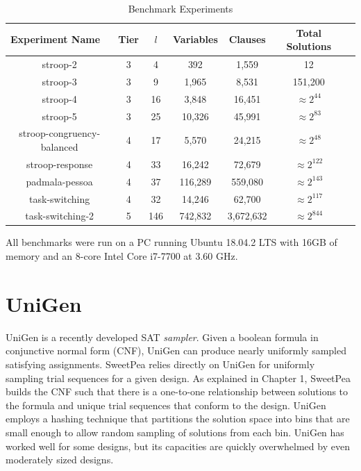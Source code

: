 \begin{table}[htb]
  \centering
  \caption{Benchmark Experiments}
\begin{tabular}{|c|c|c|c|c|c|c|}
\hline
\multicolumn{1}{|l|}{Experiment Name} & Tier            & $l$             & Variables  & Clauses    & Total Solutions    \\ \hline
stroop-2                              & 3               & 4               & 392        & 1,559      & 12                 \\ \hline
stroop-3                              & 3               & 9               & 1,965      & 8,531      & 151,200            \\ \hline
stroop-4                              & 3               & 16              & 3,848      & 16,451     & $\approx 2^{44}$   \\ \hline
stroop-5                              & 3               & 25              & 10,326     & 45,991     & $\approx 2^{83}$   \\ \hline
stroop-congruency-balanced            & 4               & 17              & 5,570      & 24,215     & $\approx 2^{48}$   \\ \hline
stroop-response                       & 4               & 33              & 16,242     & 72,679     & $\approx 2^{122}$  \\ \hline
padmala-pessoa                        & 4               & 37              & 116,289    & 559,080    & $\approx 2^{143}$  \\ \hline
task-switching                        & 4               & 32              & 14,246     & 62,700     & $\approx 2^{117}$  \\ \hline
task-switching-2                      & 5               & 146             & 742,832    & 3,672,632  & $\approx 2^{844}$  \\ \hline
\end{tabular}
\label{tab:benchmark_experiments}
\end{table}

All benchmarks were run on a PC running Ubuntu 18.04.2 LTS with 16GB of memory and an 8-core Intel Core i7-7700 at 3.60 GHz.


\section{UniGen}

UniGen \cite{chakraborty2013scalable,chakraborty_balancing_2014} is a recently developed SAT \textit{sampler}. Given a boolean formula in conjunctive normal form (CNF), UniGen can produce nearly uniformly sampled satisfying assignments. SweetPea relies directly on UniGen for uniformly sampling trial sequences for a given design. As explained in Chapter 1, SweetPea builds the CNF such that there is a one-to-one relationship between solutions to the formula and unique trial sequences that conform to the design. UniGen employs a hashing technique that partitions the solution space into bins that are small enough to allow random sampling of solutions from each bin. UniGen has worked well for some designs, but its capacities are quickly overwhelmed by even moderately sized designs.

